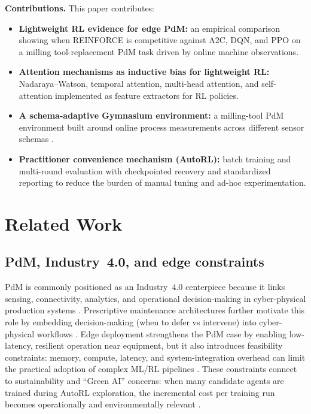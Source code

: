 \documentclass[sn-basic]{sn-jnl} %
\begin{document}
\textbf{Contributions.}
This paper contributes:
\begin{itemize}
        \item \textbf{Lightweight RL evidence for edge PdM:} an empirical comparison showing when \textsc{REINFORCE} is competitive against \textsc{A2C}, \textsc{DQN}, and \textsc{PPO} on a milling tool-replacement PdM task driven by online machine observations.
        \item \textbf{Attention mechanisms as inductive bias for lightweight RL:} Nadaraya--Watson, temporal attention, multi-head attention, and self-attention implemented as feature extractors for RL policies.
        \item \textbf{A schema-adaptive Gymnasium environment:} a milling-tool PdM environment built around online process measurements across different sensor schemas \cite{Foundation2023}.
        \item \textbf{Practitioner convenience mechanism (AutoRL):} batch training and multi-round evaluation with checkpointed recovery and standardized reporting to reduce the burden of manual tuning and ad-hoc experimentation.
\end{itemize}


\section{Related Work}
\subsection{PdM, Industry~4.0, and edge constraints}
PdM is commonly positioned as an Industry~4.0 centerpiece because it links sensing, connectivity, analytics, and operational decision-making in cyber-physical production systems \cite{Compare2020, Zonta2020}. Prescriptive maintenance architectures further motivate this role by embedding decision-making (when to defer vs intervene) into cyber-physical workflows \cite{Ansari2019}. Edge deployment strengthens the PdM case by enabling low-latency, resilient operation near equipment, but it also introduces feasibility constraints: memory, compute, latency, and system-integration overhead can limit the practical adoption of complex ML/RL pipelines \cite{Njor2024, Pandey2023}. These constraints connect to sustainability and ``Green AI'' concerns: when many candidate agents are trained during AutoRL exploration, the incremental cost per training run becomes operationally and environmentally relevant \cite{Schwartz2020, Strubell2019}.
\end{document}
